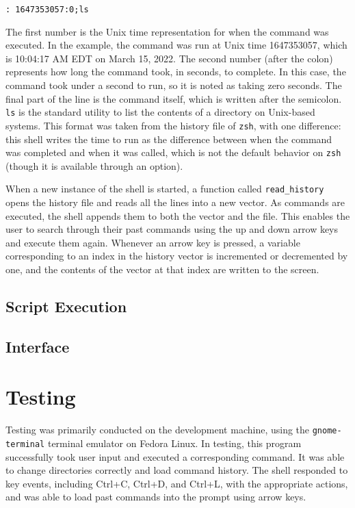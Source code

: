 \documentclass[12pt,twoside]{report} %
\begin{document}
	\begin{lstlisting}
: 1647353057:0;ls\end{lstlisting}

	The first number is the Unix time representation for when the command was executed. In the example, the command was run at Unix time 1647353057, which is 10:04:17 AM EDT on March 15, 2022. The second number (after the colon) represents how long the command took, in seconds, to complete. In this case, the command took under a second to run, so it is noted as taking zero seconds. The final part of the line is the command itself, which is written after the semicolon. \verb|ls| is the standard utility to list the contents of a directory on Unix-based systems. This format was taken from the history file of \verb|zsh|, with one difference: this shell writes the time to run as the difference between when the command was completed and when it was called, which is not the default behavior on \verb|zsh| (though it is available through an option).
	
	When a new instance of the shell is started, a function called \verb|read_history| opens the history file and reads all the lines into a new vector. As commands are executed, the shell appends them to both the vector and the file. This enables the user to search through their past commands using the up and down arrow keys and execute them again. Whenever an arrow key is pressed, a variable corresponding to an index in the history vector is incremented or decremented by one, and the contents of the vector at that index are written to the screen.
	
	\subsection{Script Execution} \label{sec:script-execution}

	\subsection{Interface} \label{sec:interface}
	

	\section{Testing} \label{sec:testing}
	Testing was primarily conducted on the development machine, using the \verb|gnome-terminal| terminal emulator on Fedora Linux. In testing, this program successfully took user input and executed a corresponding command. It was able to change directories correctly and load command history. The shell responded to key events, including Ctrl+C, Ctrl+D, and Ctrl+L, with the appropriate actions, and was able to load past commands into the prompt using arrow keys.
\end{document}
